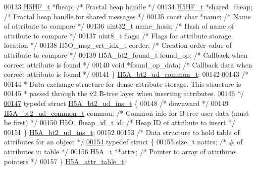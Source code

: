 \begin{DoxyCode}
00133     \hyperlink{struct_h5_h_f__t}{H5HF\_t}      *fheap;                 \textcolor{comment}{/* Fractal heap handle               */}
00134     \hyperlink{struct_h5_h_f__t}{H5HF\_t}      *shared\_fheap;          \textcolor{comment}{/* Fractal heap handle for shared messages */}
00135     \textcolor{keyword}{const} \textcolor{keywordtype}{char}  *name;                  \textcolor{comment}{/* Name of attribute to compare      */}
00136     uint32\_t    name\_hash;              \textcolor{comment}{/* Hash of name of attribute to compare */}
00137     uint8\_t     flags;                  \textcolor{comment}{/* Flags for attribute storage location */}
00138     H5O\_msg\_crt\_idx\_t corder;           \textcolor{comment}{/* Creation order value of attribute to compare */}
00139     H5A\_bt2\_found\_t found\_op;           \textcolor{comment}{/* Callback when correct attribute is found */}
00140     \textcolor{keywordtype}{void}        *found\_op\_data;         \textcolor{comment}{/* Callback data when correct attribute is found */}
00141 \} \hyperlink{struct_h5_a__bt2__ud__common__t}{H5A\_bt2\_ud\_common\_t};
00142 
00143 \textcolor{comment}{/*}
00144 \textcolor{comment}{ * Data exchange structure for dense attribute storage.  This structure is}
00145 \textcolor{comment}{ * passed through the v2 B-tree layer when inserting attributes.}
00146 \textcolor{comment}{ */}
\hyperlink{struct_h5_a__bt2__ud__ins__t}{00147} \textcolor{keyword}{typedef} \textcolor{keyword}{struct }\hyperlink{struct_h5_a__bt2__ud__ins__t}{H5A\_bt2\_ud\_ins\_t} \{
00148     \textcolor{comment}{/* downward */}
00149     \hyperlink{struct_h5_a__bt2__ud__common__t}{H5A\_bt2\_ud\_common\_t} common;         \textcolor{comment}{/* Common info for B-tree user data (must be
       first) */}
00150     H5O\_fheap\_id\_t id;                  \textcolor{comment}{/* Heap ID of attribute to insert    */}
00151 \} \hyperlink{struct_h5_a__bt2__ud__ins__t}{H5A\_bt2\_ud\_ins\_t};
00152 
00153 \textcolor{comment}{/* Data structure to hold table of attributes for an object */}
\hyperlink{struct_h5_a__attr__table__t}{00154} \textcolor{keyword}{typedef} \textcolor{keyword}{struct }\{
00155     \textcolor{keywordtype}{size\_t}      nattrs;         \textcolor{comment}{/* # of attributes in table */}
00156     \hyperlink{struct_h5_a__t}{H5A\_t}       **attrs;        \textcolor{comment}{/* Pointer to array of attribute pointers */}
00157 \} \hyperlink{struct_h5_a__attr__table__t}{H5A\_attr\_table\_t};

\end{DoxyCode}
